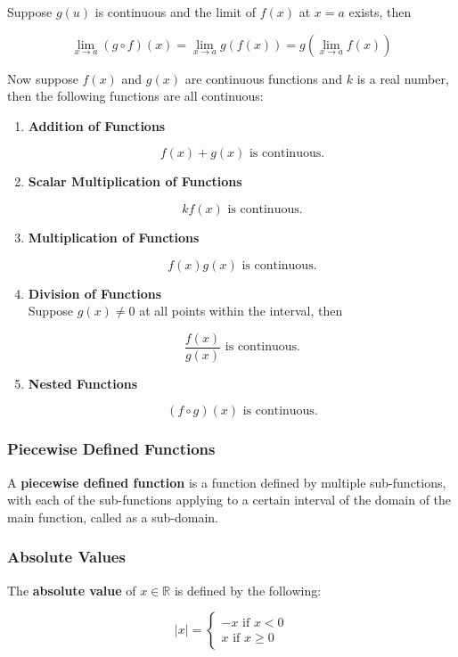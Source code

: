 \documentclass[a4paper,12pt]{article}
\newcommand{\s}{\vspace{1mm}}
\newcommand{\R}{\mathbb{R}}
\newenvironment{alist}{ %
\begin{enumerate}[label=(\alph*)]
}{
\end{enumerate}
}
\begin{document}
Suppose $g(u)$ is continuous and the limit of $f(x)$ at $x=a$ exists, then

$$\lim_{x\to a}(g\circ f)(x)=\lim_{x\to a}g(f(x))=g(\lim_{x\to a}f(x))$$\s

Now suppose $f(x)$ and $g(x)$ are continuous functions and $k$ is a real number, then the following functions are all continuous:
\begin{alist}
  \item \textbf{Addition of Functions}

  $$f(x)+g(x)\text{ is continuous.}$$

  \item \textbf{Scalar Multiplication of Functions}

  $$kf(x)\text{ is continuous.}$$

  \item \textbf{Multiplication of Functions}

  $$f(x)g(x)\text{ is continuous.}$$

  \item \textbf{Division of Functions}\\
  Suppose $g(x)\neq 0$ at all points within the interval, then

  $$\frac{f(x)}{g(x)}\text{ is continuous.}$$

  \item \textbf{Nested Functions}

  $$(f\circ g)(x)\text{ is continuous.}$$
\end{alist}

\subsubsection{Piecewise Defined Functions}
A \textbf{piecewise defined function} is a function defined by multiple sub-functions, with each of the sub-functions applying to a certain interval of the domain of the main function, called as a sub-domain.

\subsubsection{Absolute Values}
The \textbf{absolute value} of $x\in \R$ is defined by the following:

$$\left| x\right| =\left\{ \begin{matrix}
  -x\text{ if }x<0\\
  x\text{ if }x\geq 0
\end{matrix}\right.$$\s
\end{document}
